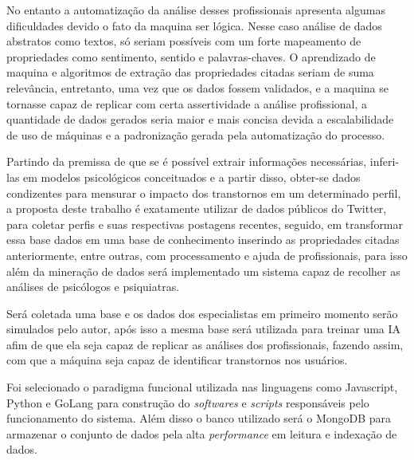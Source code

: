 No entanto a automatização da análise desses profissionais apresenta algumas dificuldades devido o fato da maquina ser lógica. Nesse caso análise de dados abstratos como textos, só seriam possíveis com um forte mapeamento de propriedades como sentimento, sentido e palavras-chaves. O aprendizado de maquina e algoritmos de extração das propriedades citadas seriam de suma relevância, entretanto, uma vez que os dados fossem validados, e a maquina se tornasse capaz de replicar com certa assertividade a análise profissional, a quantidade de dados gerados seria maior e mais concisa devida a escalabilidade de uso de máquinas e a padronização gerada pela automatização do processo.

Partindo da premissa de que se é possível extrair informações necessárias, inferi-las em modelos psicológicos conceituados e a partir disso, obter-se dados condizentes para mensurar o impacto dos transtornos em um determinado perfil, a proposta deste trabalho é exatamente utilizar de dados públicos do Twitter, para coletar perfis e suas respectivas postagens recentes, seguido, em transformar essa base dados em uma base de conhecimento inserindo as propriedades citadas anteriormente, entre outras, com processamento e ajuda de profissionais, para isso além da mineração de dados será implementado um sistema capaz de recolher as análises de psicólogos e psiquiatras.

Será coletada uma base e os dados dos especialistas em primeiro momento serão simulados pelo autor, após isso a mesma base será utilizada para treinar uma IA afim de que ela seja capaz de replicar as análises dos profissionais, fazendo assim, com que a máquina seja capaz de identificar transtornos nos usuários.

Foi selecionado o paradigma funcional utilizada nas linguagens como Javascript, Python e GoLang para construção do \textit{softwares} e \textit{scripts} responsáveis pelo funcionamento do sistema. Além disso o banco utilizado será o MongoDB para armazenar o conjunto de dados pela alta \textit{performance} em leitura e indexação de dados.
